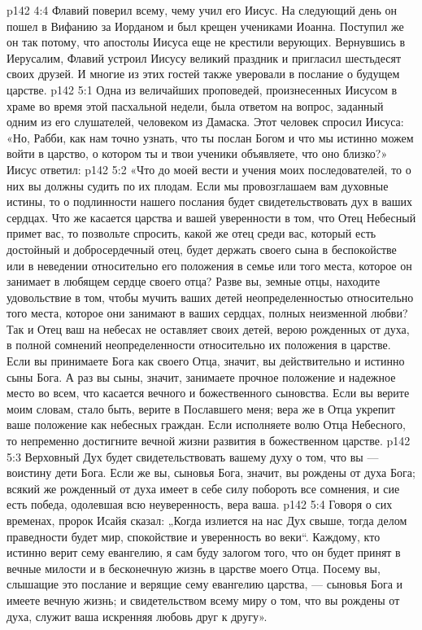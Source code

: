 \vs p142 4:4 \pc Флавий поверил всему, чему учил его Иисус. На следующий день он пошел в Вифанию за Иорданом и был крещен учениками Иоанна. Поступил же он так потому, что апостолы Иисуса еще не крестили верующих. Вернувшись в Иерусалим, Флавий устроил Иисусу великий праздник и пригласил шестьдесят своих друзей. И многие из этих гостей также уверовали в послание о будущем царстве.
\vs p142 5:1 Одна из величайших проповедей, произнесенных Иисусом в храме во время этой пасхальной недели, была ответом на вопрос, заданный одним из его слушателей, человеком из Дамаска. Этот человек спросил Иисуса: «Но, Рабби, как нам точно узнать, что ты послан Богом и что мы истинно можем войти в царство, о котором ты и твои ученики объявляете, что оно близко?» Иисус ответил:
\vs p142 5:2 \pc «Что до моей вести и учения моих последователей, то о них вы должны судить по их плодам. Если мы провозглашаем вам духовные истины, то о подлинности нашего послания будет свидетельствовать дух в ваших сердцах. Что же касается царства и вашей уверенности в том, что Отец Небесный примет вас, то позвольте спросить, какой же отец среди вас, который есть достойный и добросердечный отец, будет держать своего сына в беспокойстве или в неведении относительно его положения в семье или того места, которое он занимает в любящем сердце своего отца? Разве вы, земные отцы, находите удовольствие в том, чтобы мучить ваших детей неопределенностью относительно того места, которое они занимают в ваших сердцах, полных неизменной любви? Так и Отец ваш на небесах не оставляет своих детей, верою рожденных от духа, в полной сомнений неопределенности относительно их положения в царстве. Если вы принимаете Бога как своего Отца, значит, вы действительно и истинно сыны Бога. А раз вы сыны, значит, занимаете прочное положение и надежное место во всем, что касается вечного и божественного сыновства. Если вы верите моим словам, стало быть, верите в Пославшего меня; вера же в Отца укрепит ваше положение как небесных граждан. Если исполняете волю Отца Небесного, то непременно достигните вечной жизни развития в божественном царстве.
\vs p142 5:3 Верховный Дух будет свидетельствовать вашему духу о том, что вы --- воистину дети Бога. Если же вы, сыновья Бога, значит, вы рождены от духа Бога; всякий же рожденный от духа имеет в себе силу побороть все сомнения, и сие есть победа, одолевшая всю неуверенность, вера ваша.
\vs p142 5:4 Говоря о сих временах, пророк Исайя сказал: „Когда излиется на нас Дух свыше, тогда делом праведности будет мир, спокойствие и уверенность во веки“. Каждому, кто истинно верит сему евангелию, я сам буду залогом того, что он будет принят в вечные милости и в бесконечную жизнь в царстве моего Отца. Посему вы, слышащие это послание и верящие сему евангелию царства, --- сыновья Бога и имеете вечную жизнь; и свидетельством всему миру о том, что вы рождены от духа, служит ваша искренняя любовь друг к другу».
